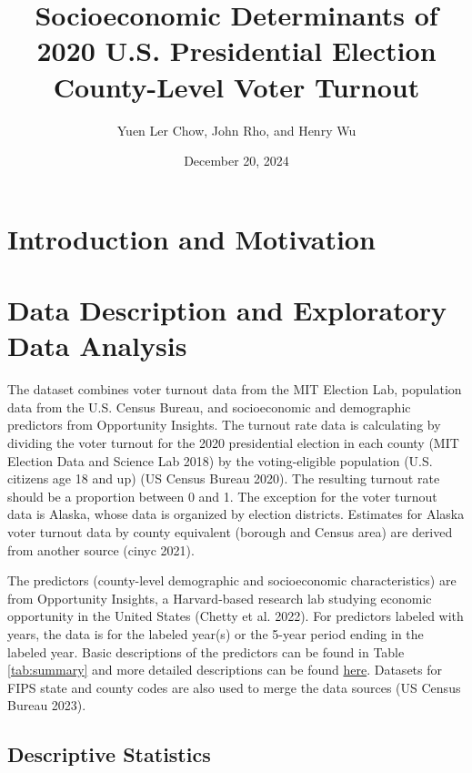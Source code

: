\documentclass[
]{article}
\title{Socioeconomic Determinants of 2020 U.S. Presidential Election County-Level Voter Turnout}
\author{Yuen Ler Chow, John Rho, and Henry Wu}
\date{December 20, 2024}
\begin{document}
\maketitle

{
\hypersetup{linkcolor=}
\setcounter{tocdepth}{2}
\tableofcontents
}
\section{Introduction and Motivation}\label{introduction-and-motivation}

\section{Data Description and Exploratory Data Analysis}\label{data-description-and-exploratory-data-analysis}

The dataset combines voter turnout data from the MIT Election Lab, population data from the U.S. Census Bureau, and socioeconomic and demographic predictors from Opportunity Insights. The turnout rate data is calculating by dividing the voter turnout for the 2020 presidential election in each county (MIT Election Data and Science Lab 2018) by the voting-eligible population (U.S. citizens age 18 and up) (US Census Bureau 2020). The resulting turnout rate should be a proportion between 0 and 1. The exception for the voter turnout data is Alaska, whose data is organized by election districts. Estimates for Alaska voter turnout data by county equivalent (borough and Census area) are derived from another source (cinyc 2021).

The predictors (county-level demographic and socioeconomic characteristics) are from Opportunity Insights, a Harvard-based research lab studying economic opportunity in the United States (Chetty et al. 2022). For predictors labeled with years, the data is for the labeled year(s) or the 5-year period ending in the labeled year. Basic descriptions of the predictors can be found in Table \ref{tab:summary} and more detailed descriptions can be found \href{https://opportunityinsights.org/wp-content/uploads/2019/07/Codebook-for-Table-10.pdf}{here}. Datasets for FIPS state and county codes are also used to merge the data sources (US Census Bureau 2023).

\subsection{Descriptive Statistics}\label{descriptive-statistics}
\end{document}
